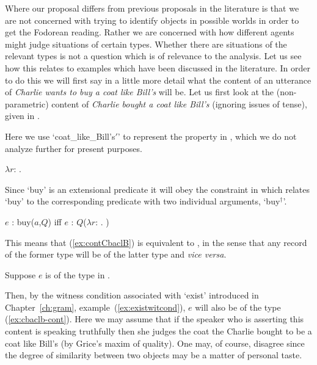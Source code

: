 Where our proposal differs from previous proposals in the literature
is that we are not concerned with trying to identify
objects in possible worlds in order to get the Fodorean reading.
Rather we are concerned with how different agents might judge
situations of certain types.  Whether there are situations of the
relevant types is not a question which is of relevance to the
analysis.  Let us see how this relates to examples which have been
discussed in the literature.  
In order to do this we will first say in a little more detail what the
content of an utterance of \textit{Charlie wants to buy a coat like
  Bill's} will be.  Let us first look at the (non-parametric) content of
\textit{Charlie bought a coat like Bill's} (ignoring issues of tense), given in \nexteg{}.
\begin{ex} 
\label{ex:contCbaclB} 
\end{ex} 
Here we use `coat\_like\_Bill's$'$' to represent the property in
\nexteg{}, which we do not analyze further for present purposes.
\begin{ex} 
$\lambda r$: .  
\end{ex} 
Since `buy' is an extensional predicate it will obey the constraint in
\nexteg{} which relates `buy' to the corresponding predicate with two
individual arguments, `buy$^\dagger$'.
\begin{ex} 
$e$ : buy($a$,$Q$) iff $e$ : $Q$($\lambda
r$:
. ) 
\end{ex} 
This means that (\ref{ex:contCbaclB}) is equivalent to \nexteg{}, in
the sense that any record of the former type will be of the latter
type and \textit{vice versa}.
\begin{ex} 
\label{ex:cbaclb-cont}
\end{ex} 
Suppose $e$ is of the type in \nexteg{}.
\begin{ex} 
\end{ex}
Then, by the witness condition associated with `exist' introduced in
Chapter~\ref{ch:gram}, example~(\ref{ex:existwitcond}), $e$ will also
be of the type (\ref{ex:cbaclb-cont}).  Here we may assume that if the
speaker who is asserting this content is speaking truthfully then she
judges the coat the Charlie bought to be a coat like Bill's (by Grice's
maxim of quality).  One may, of course, disagree since the degree of
similarity between two objects may be a matter of personal taste.

